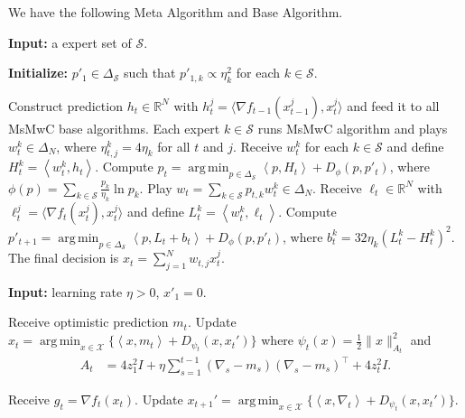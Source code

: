 \documentclass{article}
\theoremstyle{plain}
\theoremstyle{definition}
\theoremstyle{remark}
\DeclareMathOperator*{\argmin}{arg\,min}
\newcommand{\cA}{\mathcal{A}}
\newcommand{\cS}{\mathcal{S}}
\newcommand{\cX}{\mathcal{X}}
\newcommand{\real}{\mathbb{R}}
\newcommand{\inner}[2]{\left\langle #1, #2 \right\rangle}
\begin{document}
We have the following Meta Algorithm and Base Algorithm.
\begin{algorithm}[h]
\caption{Meta Algorithm (MsMwC--Master)}\label{alg:metafree}
\textbf{Input:} a expert set of $\cS$.

\textbf{Initialize:} $p'_1\in\Delta_{\cS}$ such that $p'_{1,k}\propto \eta_k^2$ for each $k\in\cS$.
\begin{algorithmic}[1]
\STATE Construct prediction $h_t\in\real^N$ with $h_t^j=\langle \nabla f_{t-1}(x_{t-1}^j), x_t^j \rangle$ and feed it to all MsMwC base algorithms.
\STATE Each  expert $k\in\cS$ runs MsMwC algorithm and plays $w_t^k\in\Delta_N$, where $\eta_{t,j}^k=4\eta_k$ for all $t$ and $j$.
\STATE Receive $w_t^k$ for each $k\in\cS$ and define $H_{t}^k=\inner{w_t^k}{h_t}$.
\STATE Compute $p_t=\argmin_{p\in\Delta_{\cS}}\inner{p}{H_t}+D_{\phi}(p,p'_t)$, where $ \phi(p)=\sum_{k\in\cS}\frac{p_k}{\eta_k}\ln p_k$.
\STATE Play $w_t=\sum_{k\in\cS}p_{t,k}w_t^k\in\Delta_N$.
\STATE Receive $\ell_t\in\real^N$ with $\ell_t^j=\langle\nabla f_{t}(x_{t}^j) , x_t^j \rangle$ and define $L_{t}^k=\inner{w_t^k}{\ell_t}$. 
\STATE Compute 
$p'_{t+1}=\argmin_{p\in\Delta_{\cS}}\inner{p}{L_t+b_t}+D_{\phi}(p,p'_t)$, where $b_t^k=32\eta_k(L_t^k-H_t^k)^2$.
\STATE The final decision is $x_t=\sum_{j=1}^N w_{t,j} x_t^j$.

\ENDFOR
\end{algorithmic}
\end{algorithm}

\begin{algorithm}[tb]
\caption{Base Algorithm $\cA$ (ONS)}\label{alg:basefree}
\begin{algorithmic}[1]
    \STATE \textbf{Input:} learning rate $\eta>0$, $x'_1=0$.
    
        \STATE Receive optimistic prediction $m_t$.
        \STATE Update $x_t = \argmin_{x\in\cX}\{\inner{x}{m_t} + D_{\psi_{t}}(x,x_t')\}$  where $\psi_t(x) = \frac{1}{2}\|x\|_{A_t}^2$ and
        \begin{align*}
            A_t &= 4z_1^2 I + \eta\sum_{s=1}^{t-1} (\nabla_s - m_s)(\nabla_s - m_s)^\top + 4z_t^2 I.
        \end{align*}
        
        \STATE Receive $g_t=\nabla f_t(x_t)$.
        \STATE Update $x_{t+1}' = \argmin_{x\in\cX}\{\inner{x}{\nabla_t} + D_{\psi_t}(x, x_t')\}$.
    \ENDFOR
\end{algorithmic}
\end{algorithm}
\end{document}
